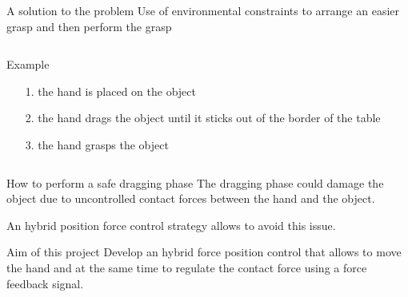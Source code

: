 \begin{frame}{A solution to the problem}
  Use of environmental constraints to arrange an easier grasp and
  then perform the grasp
  \begin{columns}
    \begin{column}{0.5\textwidth}
      \begin{exampleblock}{Example}
        \begin{itemize}
        \item[1.] the hand is placed on the object
        \item[2.] the hand drags the object until it \alert{sticks out 
          of the border} of the table 
        \item[3.] the hand grasps the object
        \end{itemize}
      \end{exampleblock}
    \end{column}
  \end{columns}
\end{frame}

\begin{frame}{How to perform a safe dragging phase}
  The dragging phase could \alert{damage} the object due to uncontrolled contact forces between the 
  hand and the object.
  \par
  An hybrid position force control strategy allows to avoid this issue.
  \vskip0.5in
  \begin{exampleblock}{Aim of this project}
    Develop an hybrid force position control that allows to move the hand and 
    at the same time to regulate the contact force using a force feedback signal.
  \end{exampleblock}
\end{frame}
